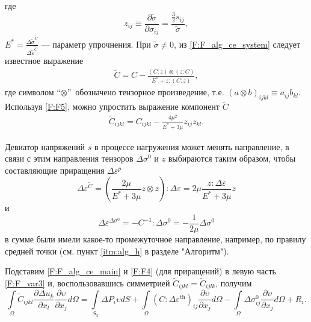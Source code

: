 где
\begin{equation}
z_{ij}\equiv\frac{\partial\tilde{\sigma}}{\partial\sigma_{ij}}=\frac{\frac{3}{2}s_{ij}}{\tilde{\sigma}},
\label{F:F_alg_ce10}
\end{equation}
$E^{*}=\frac{\Delta\tilde{\sigma}^{\tilde{C}}}{\Delta\tilde{\varepsilon}^{\tilde{C}}}$ --- параметр упрочнения. При $\tilde{\sigma}\neq 0$, из \eqref{F:F_alg_ce_system} следует известное \cite{Zienkiewicz1975,Belytschko2000} выражение
\begin{equation}
\begin{gathered}
\tilde{C}=C-\frac{\left(C:z\right)\otimes \left(z:C\right) }{E^{*}+z:\left(C:z\right)},
\label{F:F_alg_C_pl}
\end{gathered}
\end{equation}
где символом \textquotedblleft $\otimes$\textquotedblright \ обозначено тензорное произведение, т.е. $\left( a\otimes b\right)_{ijkl} \equiv a_{ij}b_{kl}$.
Используя \eqref{F:F5}, можно упростить выражение компонент $\tilde{C}$
\begin{equation}
\begin{gathered}
\tilde{C}_{ijkl}=C_{ijkl}-\frac{4\mu^2}{E^{*}+3\mu}z_{ij}z_{kl}.
\label{F:F_alg_C_pl_parts}
\end{gathered}
\end{equation}

Девиатор напряжений $s$ в процессе нагружения может менять направление, в связи с этим направления тензоров $\Delta\sigma^{0}$ и $z$ выбираются таким образом, чтобы составляющие приращения $\Delta\varepsilon^{p}$
\begin{equation}
\Delta\varepsilon^{\tilde{C}}=\left(\frac{2\mu}{E^{*}+3\mu}z\otimes z\right):\Delta\varepsilon=2\mu\frac{z:\Delta\varepsilon}{E^{*}+3\mu}z
\label{F:F_alg_ce13}
\end{equation}
и
\begin{equation}
\Delta\varepsilon^{\Delta\sigma^{0}}=-C^{-1}:\Delta\sigma^{0}=-\frac{1}{2\mu}\Delta\sigma^{0}
\label{F:F_alg_ce14}
\end{equation}
в сумме были имели какое-то промежуточное направление, например, по правилу средней точки \cite{Ortiz1985} (см. пункт \ref{itm:alg_h} в разделе "Алгоритм").

Подставим \eqref{F:F_alg_ce_main} и \eqref{F:F4} (для приращений) в левую часть \eqref{F:F_var3} и, воспользовавшись симметрией \mbox{$\tilde{C}_{ijkl}=\tilde{C}_{ijlk}$}, получим 
\begin{equation}
\int\limits_{\Omega}\tilde{C}_{ijkl} \frac{\partial \Delta u_{k}}{\partial x_{l}} \frac{\partial\upsilon}{\partial x_j}d\Omega=\int\limits_{S_{2}}\Delta P_{i}\upsilon dS
+\int\limits_{\Omega}\left(C:\Delta\varepsilon^{\mathrm{th}}\right)_{ij}\frac{\partial\upsilon}{\partial x_j}d\Omega
-\int\limits_{\Omega}\Delta\sigma_{ij}^{0}\frac{\partial\upsilon}{\partial x_j}d\Omega+R_{i}.
\label{F:F_alg_var1}
\end{equation}

